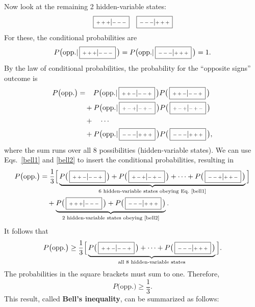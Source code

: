 \documentclass[pra,12pt]{revtex4-2}
\def\hvbox[#1]#2{\,\boxed{\scalebox{0.7}{$\,#1$}|\scalebox{0.7}{$#2\,$}}}
\begin{document}
Now look at the remaining 2 hidden-variable states:
\begin{equation*}
    \hvbox[+++]{---} \;\;\;
    \hvbox[---]{+++}
\end{equation*}
For these, the conditional probabilities are
\begin{equation}
  P\big(\textrm{opp.} | \hvbox[+++]{---}\,\big) =
  P\big(\textrm{opp.} | \hvbox[---]{+++}\,\big) = 1.
  \label{bell2}
\end{equation}
By the law of conditional probabilities, the probability for the
``opposite signs'' outcome is
\begin{align}
  \begin{aligned}
    P\big(\textrm{opp.}\big) &= \;\;\;
    P\big(\textrm{opp.} | \hvbox[++-]{--+}\,\big)
    P\big(\hvbox[++-]{--+}\,\big) \\
    &\quad+ P\big(\textrm{opp.} | \hvbox[+-+]{-+-}\,\big)
    P\big(\hvbox[+-+]{-+-}\,\big) \\
    &\quad+ \quad \cdots \\
    &\quad+ P\big(\textrm{opp.} | \hvbox[---]{+++}\,\big)
    P\big(\hvbox[---]{+++}\,\big),
  \end{aligned}
\end{align}
where the sum runs over all 8 possibilities (hidden-variable states).
We can use Eqs.~\eqref{bell1} and \eqref{bell2} to insert the
conditional probabilities, resulting in
\begin{align}
  \begin{aligned}
    P\big(\textrm{opp.}\big) &=
    \frac{1}{3} \Big[\underbrace{P\big(\hvbox[++-]{--+}\,\big)
      + P\big(\hvbox[+-+]{-+-}\,\big)
      + \cdots + P\big(\hvbox[--+]{++-}\,\big)}_{\textrm{6 hidden-variable states
obeying Eq.~\eqref{bell1}}}\Big] \\
    &\quad + \underbrace{P\big(\hvbox[+++]{---}\,\big)
    + P\big(\hvbox[---]{+++}\,\big)}_{\textrm{2 hidden-variable states obeying \eqref{bell2}}}.
  \end{aligned}
\end{align}
It follows that
\begin{equation}
  P\big(\textrm{opp.}\big) \ge
  \frac{1}{3} \Big[\underbrace{P\big(\hvbox[++-]{--+}\,\big)
      + \cdots + P\big(\hvbox[---]{+++}\,\big)}_{\textrm{all 8 hidden-variable states}}
    \Big].
  \label{bellprob}
\end{equation}
The probabilities in the square brackets must sum to one.  Therefore,
\begin{equation}
  P\big(\textrm{opp.}\big) \ge \frac{1}{3}.
  \label{bellresult}
\end{equation}
This result, called \textbf{Bell's inequality}, can be summarized as
follows:
\end{document}

